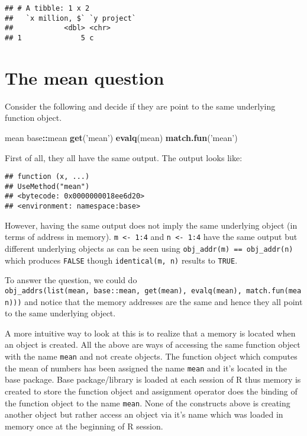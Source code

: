 \documentclass[]{book}
\newenvironment{Shaded}{\begin{snugshade}}{\end{snugshade}}
\newcommand{\KeywordTok}[1]{\textcolor[rgb]{0.13,0.29,0.53}{\textbf{#1}}}
\newcommand{\NormalTok}[1]{#1}
\newcommand{\OperatorTok}[1]{\textcolor[rgb]{0.81,0.36,0.00}{\textbf{#1}}}
\newcommand{\StringTok}[1]{\textcolor[rgb]{0.31,0.60,0.02}{#1}}
\begin{document}
\begin{verbatim}
## # A tibble: 1 x 2
##   `x million, $` `y project`
##            <dbl> <chr>      
## 1              5 c
\end{verbatim}

\hypertarget{the-mean-question}{%
\section{The mean question}\label{the-mean-question}}

Consider the following and decide if they are point to the same underlying function object.

\begin{Shaded}
\begin{Highlighting}[]
\NormalTok{mean}
\NormalTok{base}\OperatorTok{::}\NormalTok{mean}
\KeywordTok{get}\NormalTok{(}\StringTok{'mean'}\NormalTok{)}
\KeywordTok{evalq}\NormalTok{(mean)}
\KeywordTok{match.fun}\NormalTok{(}\StringTok{'mean'}\NormalTok{)}
\end{Highlighting}
\end{Shaded}

First of all, they all have the same output. The output looks like:

\begin{verbatim}
## function (x, ...) 
## UseMethod("mean")
## <bytecode: 0x0000000018ee6d20>
## <environment: namespace:base>
\end{verbatim}

However, having the same output does not imply the same underlying object (in terms of address in memory). \texttt{m\ \textless{}-\ 1:4} and \texttt{n\ \textless{}-\ 1:4} have the same output but different underlying objects as can be seen using \texttt{obj\_addr(m)\ ==\ obj\_addr(n)} which produces \texttt{FALSE} though \texttt{identical(m,\ n)} results to \texttt{TRUE}.

To answer the question, we could do \texttt{obj\_addrs(list(mean,\ base::mean,\ get(\textquotesingle{}mean\textquotesingle{}),\ evalq(mean),\ match.fun(\textquotesingle{}mean\textquotesingle{})))} and notice that the memory addresses are the same and hence they all point to the same underlying object.

A more intuitive way to look at this is to realize that a memory is located when an object is created. All the above are ways of accessing the same function object with the name \texttt{mean} and not create objects. The function object which computes the mean of numbers has been assigned the name \texttt{mean} and it's located in the base package. Base package/library is loaded at each session of R thus memory is created to store the function object and assignment operator does the binding of the function object to the name \texttt{mean}. None of the constructs above is creating another object but rather access an object via it's name which was loaded in memory once at the beginning of R session.
\end{document}
